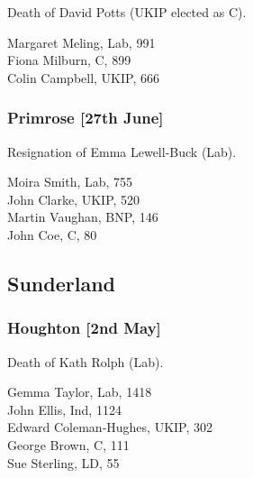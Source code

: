 \documentclass[a4paper,openany,10pt]{book}
\begin{document}

Death of David Potts (UKIP elected as C).



Margaret Meling, Lab, 991\\
Fiona Milburn, C, 899\\
Colin Campbell, UKIP, 666\\


\subsubsection*{Primrose \hspace*{\fill}\nolinebreak[1]%
\enspace\hspace*{\fill}
[27th June]}


Resignation of Emma Lewell-Buck (Lab).



Moira Smith, Lab, 755\\
John Clarke, UKIP, 520\\
Martin Vaughan, BNP, 146\\
John Coe, C, 80\\


\subsection*{Sunderland}

\subsubsection*{Houghton \hspace*{\fill}\nolinebreak[1]%
\enspace\hspace*{\fill}
[2nd May]}


Death of Kath Rolph (Lab).



Gemma Taylor, Lab, 1418\\
John Ellis, Ind, 1124\\
{Edward Coleman-Hughes}, UKIP, 302\\
George Brown, C, 111\\
Sue Sterling, LD, 55\\
\end{document}

